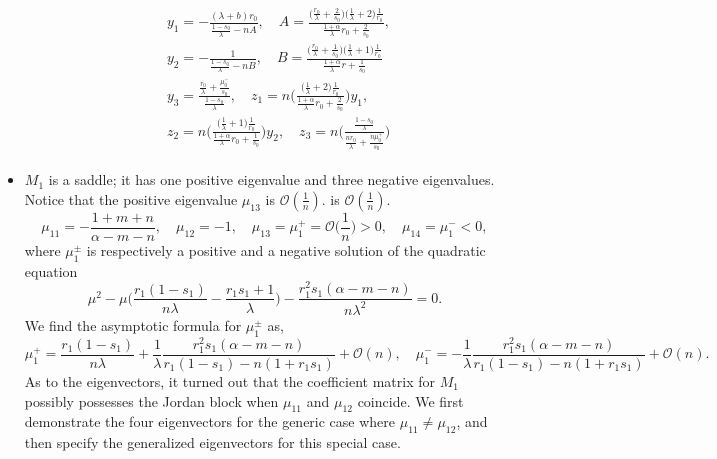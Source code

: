 \documentclass[a4paper,11pt]{article}
\def\BO{{\mathcal{O}}}
\begin{document}
\begin{itemize}
\begin{align*}
 \quad \quad
 \begin{array}{l}
   y_1=-\frac{(\lambda+b)r_0}{\frac{1-s_0}{\lambda} - nA}, \quad A=\frac{\big(\frac{r_0}{\lambda}+\frac{2}{s_0}\big)\big(\frac{1}{\lambda}+2\big)\frac{1}{r_0}}{ \frac{1+\alpha}{\lambda}r_0 + \frac{2}{s_0} }, \\
 y_2=-\frac{1}{\frac{1-s_0}{\lambda} - nB }, \quad B=\frac{\big(\frac{r_0}{\lambda}+\frac{1}{s_0}\big)\big(\frac{1}{\lambda}+1\big)\frac{1}{r_0}}{ \frac{1+\alpha}{\lambda}r + \frac{1}{s_0} }\\
 y_3=\frac{\frac{r_0}{\lambda}+\frac{\mu_0^-}{s_0}}{\frac{1-s_0}{\lambda}}, \quad
 z_1=n\bigg(\frac{\big(\frac{1}{\lambda}+2\big)\frac{1}{r_0}}{ \frac{1+\alpha}{\lambda}r_0 + \frac{2}{s_0} }\bigg)y_1, \\
 z_2=n\bigg(\frac{\big(\frac{1}{\lambda}+1\big)\frac{1}{r_0}}{ \frac{1+\alpha}{\lambda}r_0 + \frac{1}{s_0} }\bigg)y_2, \quad
 z_3=n\bigg(\frac{\frac{1-s_0}{\lambda}}{\frac{n r_0}{\lambda} + \frac{n\mu_{0}^+}{s_0}}\bigg)
%  
 \end{array}
\end{align*}
 \item $M_1$ is a saddle; it has one positive eigenvalue and three negative eigenvalues. Notice that the positive eigenvalue $\mu_{13}$ is $\mathcal{O}( \frac{1}{n})$. is $\mathcal{O}( \frac{1}{n})$.
\begin{equation}
 \mu_{11}=-\frac{1+m+n}{\alpha-m-n}, \quad \mu_{12}=-1, \quad \mu_{13}=\mu_1^+=\BO\Big(\frac{1}{n}\Big)>0, \quad \mu_{14}=\mu_1^{-}<0,
\end{equation}
where $\mu_1^\pm$ is respectively a positive and a negative solution of the quadratic equation
 $$ \mu^2 - \mu\Big(\frac{r_1(1-s_1)}{n\lambda}-\frac{r_1s_1+1}{\lambda}\Big) - \frac{r_1^2s_1(\alpha-m-n)}{n\lambda^2}=0.$$
We find the asymptotic formula for $\mu_1^\pm$ as,
$$\mu_1^+ = \frac{r_1(1-s_1)}{n\lambda} + \frac{1}{\lambda}\frac{{r_1^2s_1}(\alpha-m-n)}{ {r_1(1-s_1)}-n(1+r_1s_1) } + \BO(n), \quad \mu_1^- = -\frac{1}{\lambda}\frac{{r_1^2s_1}(\alpha-m-n)}{ {r_1(1-s_1)}-n(1+r_1s_1) } + \BO(n).$$ 
As to the eigenvectors, it turned out that the coefficient matrix for $M_1$ possibly possesses the Jordan block when $\mu_{11}$ and $\mu_{12}$ coincide. We first demonstrate the four eigenvectors for the generic case where $\mu_{11}\ne\mu_{12}$, and then specify the generalized eigenvectors for this special case.


\end{itemize}
\end{document}
